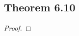 \documentclass[../../main.tex]{subfiles}
\begin{document}
\subsection{Theorem 6.10}
\begin{wts}

\end{wts}
\begin{proof}

\end{proof}
\end{document}
